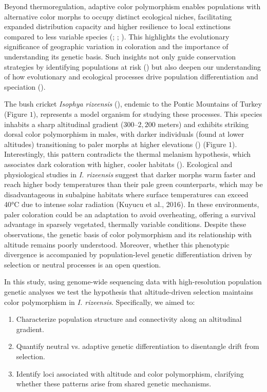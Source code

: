 \documentclass[9pt,a4paper,twoside]{rho-class/rho}
\begin{document}
    Beyond thermoregulation, adaptive color polymorphism enables populations with alternative color morphs to occupy distinct ecological niches, facilitating expanded distribution capacity and higher resilience to local extinctions compared to less variable species (\cite{Forsman2008}; \cite{Wennersten2009}; \cite{Kozlov2022}). This highlights the evolutionary significance of geographic variation in coloration and the importance of understanding its genetic basis. Such insights not only guide conservation strategies by identifying populations at risk (\cite{Forsman2016}) but also deepen our understanding of how evolutionary and ecological processes drive population differentiation and speciation (\cite{McLean2014}).
    
    The bush cricket \textit{Isophya rizeensis} (\cite{SEVGILI2003}), endemic to the Pontic Mountains of Turkey (Figure $1$), represents a model organism for studying these processes. This species inhabits a sharp altitudinal gradient ($300$–$2,200$ meters) and exhibits striking dorsal color polymorphism in males, with darker individuals (found at lower altitudes) transitioning to paler morphs at higher elevations (\cite{Çağlar2014}) (Figure $1$). Interestingly, this pattern contradicts the thermal melanism hypothesis, which associates dark coloration with higher, cooler habitats (\cite{CLUSELLATRULLAS2007}). Ecological and physiological studies in \textit{I. rizeensis} suggest that darker morphs warm faster and reach higher body temperatures than their pale green counterparts, which may be disadvantageous in subalpine habitats where surface temperatures can exceed 40°C due to intense solar radiation (Kuyucu et al., 2016). In these environments, paler coloration could be an adaptation to avoid overheating, offering a survival advantage in sparsely vegetated, thermally variable conditions. Despite these observations, the genetic basis of color polymorphism and its relationship with altitude remains poorly understood. Moreover, whether this phenotypic divergence is accompanied by population-level genetic differentiation driven by selection or neutral processes is an open question.
    
    In this study, using genome-wide sequencing data with high-resolution population genetic analyses we test the hypothesis that altitude-driven selection maintains color polymorphism in \textit{I. rizeensis}. Specifically, we aimed to: 
  
    \begin{enumerate}
    \item Characterize population structure and connectivity along an altitudinal gradient.
    \item Quantify neutral vs. adaptive genetic differentiation to disentangle drift from selection.
    \item Identify loci associated with altitude and color polymorphism, clarifying whether these patterns arise from shared genetic mechanisms.
    \end{enumerate}
\end{document}
